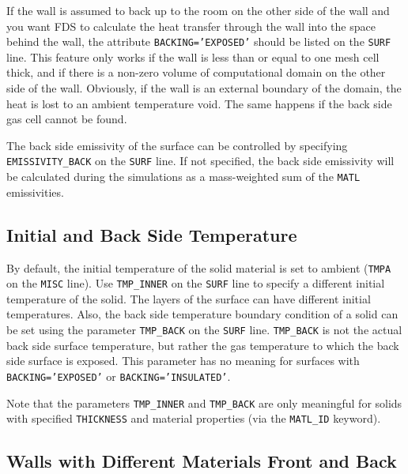 \documentclass[11pt]{book}
\newcommand{\ct}{\tt\small}
\begin{document}
If the wall is assumed to back up to the room on the other side of
the wall and you want FDS to calculate the heat transfer
through the wall into the space behind the wall, the attribute
{\ct BACKING='EXPOSED'} should be listed on the {\ct SURF} line. This feature only works
if the wall is less than or equal to one mesh cell thick, and if there is a non-zero volume
of computational domain on the other side of the wall. Obviously, if
the wall is an external boundary of the domain, the heat is lost to an ambient temperature void. The same happens if the back side
gas cell cannot be found.

The back side emissivity of the surface can be controlled by specifying {\ct EMISSIVITY\_BACK} on the {\ct SURF} line. If not specified, the back side
emissivity will be calculated during the simulations as a mass-weighted sum of the {\ct MATL} emissivities.

\subsection{Initial and Back Side Temperature}

\label{info:TMP_INNER}

By default, the initial temperature of the solid material is set to
ambient ({\ct TMPA} on the {\ct MISC} line). Use {\ct TMP\_INNER} on the {\ct SURF} line to
specify a different initial temperature of the solid. The layers of the surface can have different initial temperatures.
Also, the back side temperature boundary condition of a solid can be
set using the parameter {\ct TMP\_BACK} on the {\ct SURF}
line. {\ct TMP\_BACK} is not the actual back side surface temperature,
but rather the gas temperature to which the back side surface is exposed. This
parameter has no meaning for surfaces with {\ct BACKING='EXPOSED'} or
{\ct BACKING='INSULATED'}.

\begin{warning}
\noindent
Note that the parameters {\ct TMP\_INNER} and {\ct TMP\_BACK} are only meaningful for solids with specified {\ct THICKNESS} and material
properties (via the {\ct MATL\_ID} keyword).
\end{warning}



\subsection{Walls with Different Materials Front and Back}
\label{info:EXPOSED}
\end{document}
